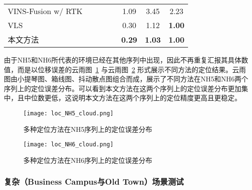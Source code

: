 \begin{table}
{\begin{tabular}{lccccccc}
VINS-Fusion w/ RTK &                                                                                &                     &                     &                     & 1.09          & 3.45          & 2.23          \\
VLS                &                                                                                &                     &                     &                     & 0.30          & 1.12          & \cellcolor[HTML]{FFCCC9}\textbf{1.00}          \\
本文方法               &                                                                                &                     &                     &                     & \cellcolor[HTML]{FFCCC9}\textbf{0.29} & \cellcolor[HTML]{FFCCC9}\textbf{1.03} & \cellcolor[HTML]{FFCCC9}\textbf{1.00} \\ \bottomrule
\end{tabular}}
\label{tab:loc_4seasons_nh47}
\end{table}

由于NH5和NH6所代表的环境已经在其他序列中出现，因此不再重复汇报其具体数值，而是以位移误差的云雨图~\ref{fig:loc_4seaons_nh5} 与云雨图~\ref{fig:loc_4seaons_nh6} 形式展示不同方法的定位结果。云雨图由小提琴图、箱线图、抖动散点图组合而成，展示了不同方法在NH5和NH6两个序列上的定位误差分布。可以看到本文方法在这两个序列上的定位误差分布更加集中，且中位数更低，这说明本文方法在这两个序列上的定位精度更高且更稳定。

\begin{figure}
  \centering
  \texttt{[image: loc\_NH5\_cloud.png]}
  \caption{多种定位方法在NH5序列上的定位误差分布}
  \label{fig:loc_4seaons_nh5}
\end{figure}

\begin{figure}
  \centering
  \texttt{[image: loc\_NH6\_cloud.png]}
  \caption{多种定位方法在NH6序列上的定位误差分布}
  \label{fig:loc_4seaons_nh6}
\end{figure}


\subsubsection{复杂（Business Campus与Old Town）场景测试}

